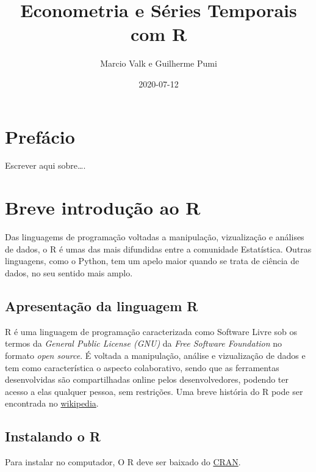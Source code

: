 \documentclass[
]{book}
\title{Econometria e Séries Temporais com R}
\author{Marcio Valk e Guilherme Pumi}
\date{2020-07-12}
\theoremstyle{definition}
\theoremstyle{definition}
\theoremstyle{definition}
\theoremstyle{remark}
\begin{document}
\maketitle

{
\setcounter{tocdepth}{1}
\tableofcontents
}
\hypertarget{prefuxe1cio}{%
\chapter*{Prefácio}\label{prefuxe1cio}}

Escrever aqui sobre\ldots.

\hypertarget{intro}{%
\chapter{Breve introdução ao R}\label{intro}}

Das linguagems de programação voltadas a manipulação, vizualização e análises de dados, o R é umas das mais difundidas entre a comunidade Estatística. Outras linguagens, como o Python, tem um apelo maior quando se trata de ciência de dados, no seu sentido mais amplo.

\hypertarget{apresentauxe7uxe3o-da-linguagem-r}{%
\section{Apresentação da linguagem R}\label{apresentauxe7uxe3o-da-linguagem-r}}

R é uma linguagem de programação caracterizada como Software Livre sob os termos da \emph{General Public License (GNU)} da \emph{Free Software Foundation} no formato \emph{open source}. É voltada a manipulação, análise e vizualização de dados e tem como característica o aspecto colaborativo, sendo que as ferramentas desenvolvidas são compartilhadas online pelos desenvolvedores, podendo ter acesso a elas qualquer pessoa, sem restrições. Uma breve história do R pode ser encontrada no \href{https://pt.wikipedia.org/wiki/R_(linguagem_de_programa\%C3\%A7\%C3\%A3o)}{wikipedia}.

\hypertarget{instalando-o-r}{%
\section{Instalando o R}\label{instalando-o-r}}

Para instalar no computador, O R deve ser baixado do \href{https://cran.r-project.org/}{CRAN}.
\end{document}
